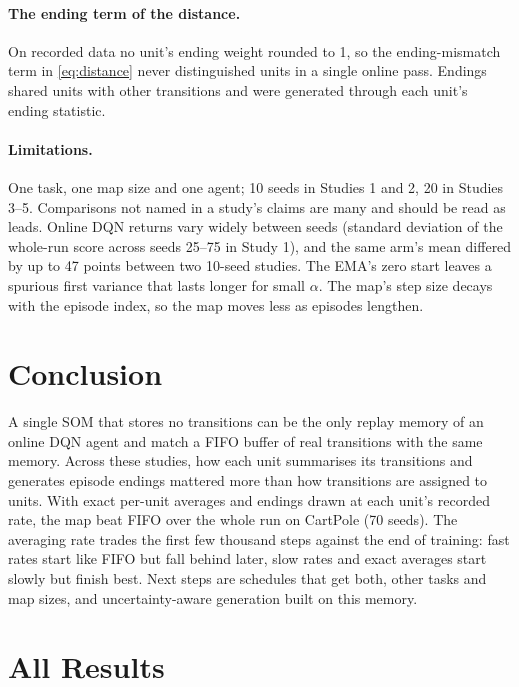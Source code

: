\documentclass{article}
\begin{document}
\paragraph{The ending term of the distance.} On recorded data no unit's
ending weight rounded to 1, so the ending-mismatch term in
\cref{eq:distance} never distinguished units in a single online pass.
Endings shared units with other transitions and were generated through each
unit's ending statistic.

\paragraph{Limitations.} One task, one map size and one agent; 10 seeds in
Studies 1 and 2, 20 in Studies 3--5. Comparisons not named in a study's claims are
many and should be read as leads. Online DQN returns vary widely between
seeds (standard deviation of the whole-run score across seeds 25--75 in
Study 1), and the same arm's mean differed by up to 47 points between two
10-seed studies. The EMA's zero start leaves a spurious first variance that
lasts longer for small $\alpha$. The map's step size decays with the episode
index, so the map moves less as episodes lengthen.

\section{Conclusion}
\label{sec:conclusion}

A single SOM that stores no transitions can be the only replay memory of an
online DQN agent and match a FIFO buffer of real transitions with the same
memory. Across these studies, how each unit summarises its transitions and
generates episode endings mattered more than how transitions are assigned to
units. With exact per-unit averages and endings drawn at each unit's
recorded rate, the map beat FIFO over the whole run on CartPole (70 seeds).
The averaging rate trades the first few thousand steps against the end of
training: fast rates start like FIFO but fall behind later, slow rates and
exact averages start slowly but finish best. Next steps are schedules that
get both, other tasks and map sizes, and uncertainty-aware generation built
on this memory.




\newpage
\appendix
\onecolumn

\section{All Results}
\label{app:all}
\end{document}
